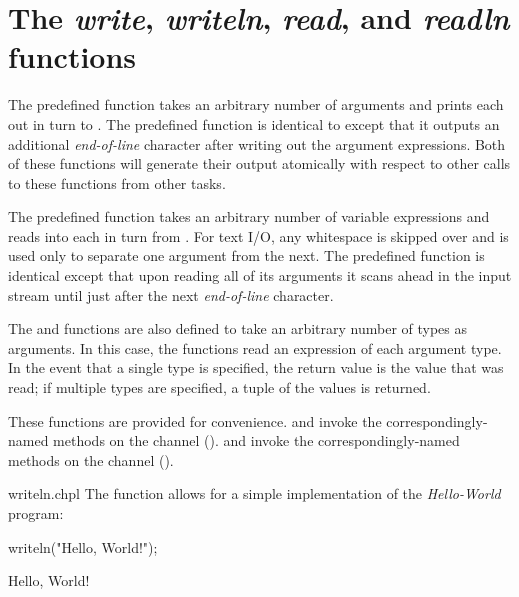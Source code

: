\section{The {\em write}, {\em writeln}, {\em read}, and {\em readln} 
functions}

The predefined function  takes an arbitrary number of
arguments and prints each out in turn to .  The predefined
function  is identical to  except that it
outputs an additional {\em end-of-line} character after writing out
the argument expressions.  Both of these functions will generate their
output atomically with respect to other calls to these functions from
other tasks.

The predefined function  takes an arbitrary number of
variable expressions and reads into each in turn from .
For text I/O, any whitespace is skipped over and is used only to separate one
argument from the next.  The predefined function  is
identical except that upon reading all of its arguments it scans ahead
in the input stream until just after the next {\em end-of-line}
character.

The  and  functions are also defined to take
an arbitrary number of types as arguments.  In this case, the
functions read an expression of each argument type.  In the event that
a single type is specified, the return value is the value that was
read; if multiple types are specified, a tuple of the values is
returned.

These functions are provided for convenience.
 and  invoke the correspondingly-named methods
on the  channel ().
 and  invoke the correspondingly-named methods
on the  channel ().

\begin{chapelexample}{writeln.chpl}
The  function allows for a simple implementation
of the {\em Hello-World} program:
\begin{chapel}
writeln("Hello, World!");
\end{chapel}
\begin{chapelprintoutput}
Hello, World!
\end{chapelprintoutput}
\end{chapelexample}


